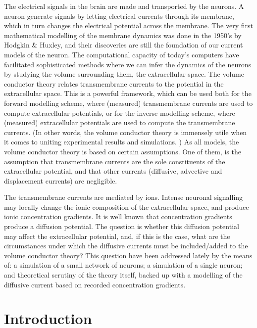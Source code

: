 \documentclass{article}
\begin{document}
The electrical signals in the brain are made and transported by the neurons. A neuron generate signals by letting electrical currents through its membrane, which in turn changes the electrical potential across the membrane. The very first mathematical modelling of the membrane dynamics was done in the 1950's by Hodgkin \& Huxley, and their discoveries are still the foundation of our current models of the neuron. The computational capacity of today's computers have facilitated sophisticated methods where we can infer the dynamics of the neurons by studying the volume surrounding them, the extracellular space. The volume conductor theory relates transmembrane currents to the potential in the extracellular space. This is a powerful framework, which can be used both for the forward modelling scheme, where (measured) transmembrane currents are used to compute extracellular potentials, or for the inverse modelling scheme, where (measured) extracellular potentials are used to compute the transmembrane currents. (In other words, the volume conductor theory is immensely utile when it comes to uniting experimental results and simulations. ) As all models, the volume conductor theory is based on certain assumptions. One of them, is the assumption that transmembrane currents are the sole constituents of the extracellular potential, and that other currents (diffusive, advective and displacement currents) are negligible. 

The transmembrane currents are mediated by ions. Intense neuronal signalling may locally change the ionic composition of the extracellular space, and produce ionic concentration gradients. It is well known that concentration gradients produce a diffusion potential. The question is whether this diffusion potential may affect the extracellular potential, and, if this is the case, what are the circumstances under which the diffusive currents must be included/added to the volume conductor theory? This question have been addressed lately by the means of: a simulation of a small network of neurons; a simulation of a single neuron; and theoretical scrutiny of the theory itself, backed up with a modelling of the diffusive current based on recorded concentration gradients. 









\section{Introduction}\label{Introduction}
\end{document}
